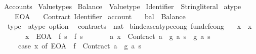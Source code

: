 %
\begin{isabellebody}%
%
%
\isadelimdocument
%
\endisadelimdocument
%
\isatagdocument
%
\isamarkuptrue%
%
\endisatagdocument
{\isafolddocument}%
%
\isadelimdocument
%
\endisadelimdocument
%
\isadelimtheory
%
\endisadelimtheory
%
\isatagtheory
{}\isamarkupfalse%
\ Accounts\isanewline
{}\ Valuetypes\isanewline
{}%
\endisatagtheory
{\isafoldtheory}%
%
\isadelimtheory
\isanewline
%
\endisadelimtheory
\isanewline
{}\isamarkupfalse%
\ Balance\ {\isacharequal}{\kern0pt}\ Valuetype\isanewline
{}\isamarkupfalse%
\ Identifier\ {\isacharequal}{\kern0pt}\ String{\isachardot}{\kern0pt}literal\isanewline
\isanewline
{}\isamarkupfalse%
\ atype\ {\isacharequal}{\kern0pt}\isanewline
\ \ \ \ EOA\isanewline
\ \ {\isacharbar}{\kern0pt}\ Contract\ Identifier\isanewline
\isanewline
\isanewline
\isanewline
{}\isamarkupfalse%
\ account\ {\isacharequal}{\kern0pt}\isanewline
\ \ bal\ {\isacharcolon}{\kern0pt}{\isacharcolon}{\kern0pt}\ Balance\isanewline
\ \ type\ {\isacharcolon}{\kern0pt}{\isacharcolon}{\kern0pt}\ {\isachardoublequoteopen}atype\ option{\isachardoublequoteclose}\isanewline
\ \ contracts\ {\isacharcolon}{\kern0pt}{\isacharcolon}{\kern0pt}\ nat\isanewline
\isanewline
{}\isamarkupfalse%
\ bind{\isacharunderscore}{\kern0pt}case{\isacharunderscore}{\kern0pt}atype{\isacharunderscore}{\kern0pt}cong\ {\isacharbrackleft}{\kern0pt}fundef{\isacharunderscore}{\kern0pt}cong{\isacharbrackright}{\kern0pt}{\isacharcolon}{\kern0pt}\isanewline
\ \ \ {\isachardoublequoteopen}x\ {\isacharequal}{\kern0pt}\ x{\isacharprime}{\kern0pt}{\isachardoublequoteclose}\isanewline
\ \ \ \ \ \ \ {\isachardoublequoteopen}x\ {\isacharequal}{\kern0pt}\ EOA\ {\isasymLongrightarrow}\ f\ s\ {\isacharequal}{\kern0pt}\ f{\isacharprime}{\kern0pt}\ s{\isachardoublequoteclose}\isanewline
\ \ \ \ \ \ \ {\isachardoublequoteopen}{\isasymAnd}a{\isachardot}{\kern0pt}\ x\ {\isacharequal}{\kern0pt}\ Contract\ a\ {\isasymLongrightarrow}\ g\ a\ s\ {\isacharequal}{\kern0pt}\ g{\isacharprime}{\kern0pt}\ a\ s{\isachardoublequoteclose}\isanewline
\ \ \ \ \ {\isachardoublequoteopen}{\isacharparenleft}{\kern0pt}case\ x\ of\ EOA\ {\isasymRightarrow}\ f\ {\isacharbar}{\kern0pt}\ Contract\ a\ {\isasymRightarrow}\ g\ a{\isacharparenright}{\kern0pt}\ s\isanewline

\end{isabellebody}
